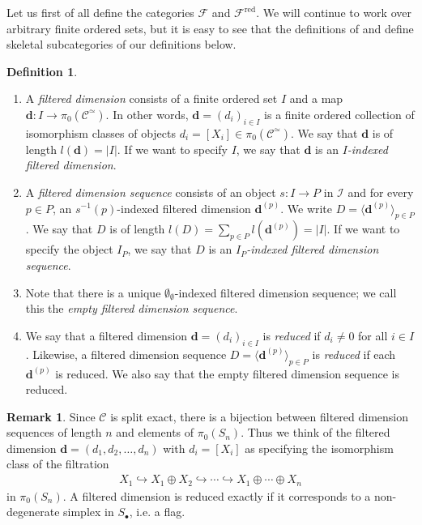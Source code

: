 \documentclass[12pt, reqno]{amsart}
\theoremstyle{plain}
\theoremstyle{definition}
\newtheorem{definition}[theorem]{Definition}
\newtheorem{remark}[theorem]{Remark}
\begin{document}
Let us first of all define the categories $\mathcal{F}$ and $\mathcal{F}^{\operatorname{red}}$. We will continue to work over arbitrary finite ordered sets, but it is easy to see that the definitions of \cite{Yuan} and \cite{Nardin} define skeletal subcategories of our definitions below.

\begin{definition} \ 
\begin{enumerate}
\item A \textit{filtered dimension} consists of a finite ordered set $I$ and a map $\mathbf{d}\colon I\rightarrow \pi_0(\mathcal{C}^\simeq)$. In other words, $\mathbf{d}=(d_i)_{i\in I}$ is a finite ordered collection of isomorphism classes of objects $d_i=[X_i]\in \pi_0(\mathcal{C}^\simeq)$. We say that $\mathbf{d}$ is of length $l(\mathbf{d})=|I|$. If we want to specify $I$, we say that $\mathbf{d}$ is an \textit{$I$-indexed filtered dimension}.

\item A \textit{filtered dimension sequence} consists of an object $s\colon I\rightarrow P$ in $\mathcal{I}$ and for every $p\in P$, an $s ^{-1}(p)$-indexed filtered dimension $\mathbf{d}^{(p)}$. We write $D=\langle\mathbf{d}^{(p)}\rangle_{p\in P}$. We say that $D$ is of length $l(D)=\sum_{p\in P}l(\mathbf{d}^{(p)})=|I|$. If we want to specify the object $I_P$, we say that $D$ is an \textit{$I_P$-indexed filtered dimension sequence}.

\item Note that there is a unique $\emptyset_\emptyset$-indexed filtered dimension sequence; we call this the \textit{empty filtered dimension sequence}.

\item We say that a filtered dimension $\mathbf{d}=(d_i)_{i\in I}$ is \textit{reduced} if $d_i\neq 0$ for all $i\in I$. Likewise, a filtered dimension sequence $D=\langle\mathbf{d}^{(p)}\rangle_{p\in P}$ is \textit{reduced} if each $\mathbf{d}^{(p)}$ is reduced. We also say that the empty filtered dimension sequence is reduced.\qedhere
\end{enumerate}
\end{definition}

\begin{remark}
Since $\mathcal{C}$ is split exact, there is a bijection between filtered dimension sequences of length $n$ and elements of $\pi_0(S_n)$. Thus we think of the filtered dimension $\mathbf{d}=(d_1,d_2,\ldots,d_n)$ with $d_i=[X_i]$ as specifying the isomorphism class of the filtration
\begin{align*}
X_1\hookrightarrow X_1\oplus X_2\hookrightarrow \cdots \hookrightarrow X_1\oplus \cdots \oplus X_n
\end{align*}
in $\pi_0(S_n)$. A filtered dimension is reduced exactly if it corresponds to a non-degenerate simplex in $S_\bullet$, i.e. a flag.
\end{remark}
\end{document}
